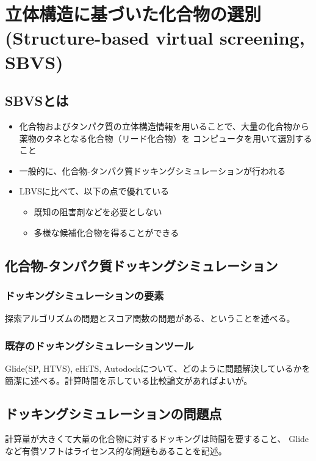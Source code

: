 \chapter{立体構造に基づいた化合物の選別(Structure-based virtual screening, SBVS)}


\section{SBVSとは}
\begin{itemize}
\item 化合物およびタンパク質の立体構造情報を用いることで、大量の化合物から薬物のタネとなる化合物（リード化合物）を
	コンピュータを用いて選別すること
\item 一般的に、化合物-タンパク質ドッキングシミュレーションが行われる
\item LBVSに比べて、以下の点で優れている %
	\begin{itemize}
	\item 既知の阻害剤などを必要としない
	\item 多様な候補化合物を得ることができる
	\end{itemize}
\end{itemize}


\section{化合物-タンパク質ドッキングシミュレーション}
\subsection{ドッキングシミュレーションの要素}
探索アルゴリズムの問題とスコア関数の問題がある、ということを述べる。

\subsection{既存のドッキングシミュレーションツール}
Glide(SP, HTVS), eHiTS, Autodockについて、どのように問題解決しているかを簡潔に述べる。計算時間を示している比較論文があればよいが。


\section{ドッキングシミュレーションの問題点}
計算量が大きくて大量の化合物に対するドッキングは時間を要すること、
Glideなど有償ソフトはライセンス的な問題もあることを記述。


